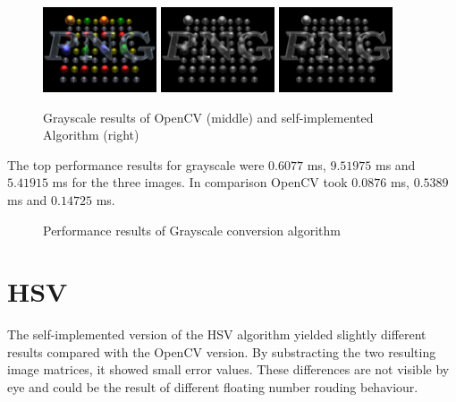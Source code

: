 \begin{figure}[H]
    \\
    \includegraphics[width=0.30\textwidth]{images/pnglogo-blk.png}
    \includegraphics[width=0.30\textwidth]{images/results/grayscale-cv.pnglogo-blk.png}
    \includegraphics[width=0.30\textwidth]{images/results/grayscale-my.pnglogo-blk.png}

    \begin{center}
        \caption{Grayscale results of OpenCV (middle) and self-implemented  Algorithm (right)}            
    \end{center}

    \label{fig:grayscale1}
\end{figure}

The top performance results for grayscale were $ 0.6077 $ ms, $ 9.51975 $ ms  and $ 5.41915 $ ms for the three images. In comparison OpenCV took $ 0.0876 $ ms, $ 0.5389 $ ms and $ 0.14725 $ ms.


\begin{center}
    \begin{figure}[H]
        \centering
        
        \caption{Performance results of Grayscale conversion algorithm}
    \end{figure}
\end{center}

\newpage
\section{HSV}

The self-implemented version of the HSV algorithm yielded slightly different results compared with the OpenCV version. By substracting the two resulting image matrices, it showed small error values. These differences are not visible by eye and could be the result of different floating number rouding behaviour.

